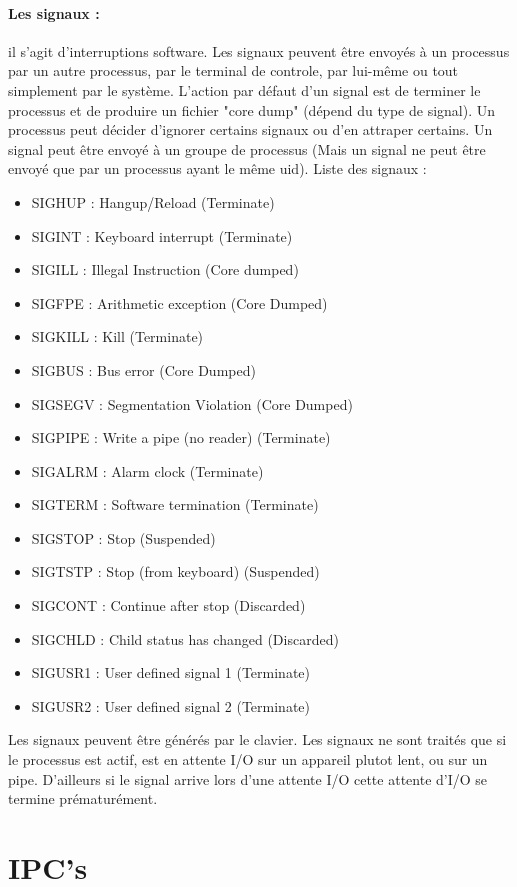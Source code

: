 \documentclass{article}[12pt]
\begin{document}
\paragraph{Les signaux : } il s'agit d'interruptions software. Les signaux peuvent être envoyés à un processus par un autre processus, par le terminal de controle, par lui-même ou tout simplement par le système. L'action par défaut d'un signal est de terminer le processus  et de produire un fichier "core dump" (dépend du type de signal). Un processus peut décider d'ignorer certains signaux ou d'en attraper certains. Un signal peut être envoyé à un groupe de processus (Mais un signal ne peut être envoyé que par un processus ayant le même uid). Liste des signaux : 
\begin{itemize}
	\item SIGHUP : Hangup/Reload (Terminate)
	\item SIGINT : Keyboard interrupt (Terminate)
	\item SIGILL : Illegal Instruction (Core dumped)
	\item SIGFPE : Arithmetic exception (Core Dumped)
	\item SIGKILL : Kill (Terminate)	
	\item SIGBUS : Bus error (Core Dumped)
	\item SIGSEGV : Segmentation Violation (Core Dumped)
	\item SIGPIPE : Write a pipe (no reader) (Terminate)
	\item SIGALRM : Alarm clock (Terminate)
	\item SIGTERM : Software termination (Terminate)
	\item SIGSTOP : Stop (Suspended)
	\item SIGTSTP : Stop (from keyboard) (Suspended)
	\item SIGCONT : Continue after stop (Discarded)
	\item SIGCHLD : Child status has changed (Discarded)
	\item SIGUSR1 : User defined signal 1 (Terminate)
	\item SIGUSR2 : User defined signal 2 (Terminate) 
\end{itemize}
Les signaux peuvent être générés par le clavier. Les signaux ne sont traités que si le processus est actif, est en attente I/O sur un appareil plutot lent, ou sur un pipe. D'ailleurs si le signal arrive lors d'une attente I/O cette attente d'I/O se termine prématurément.
\section{IPC's}
\end{document}
